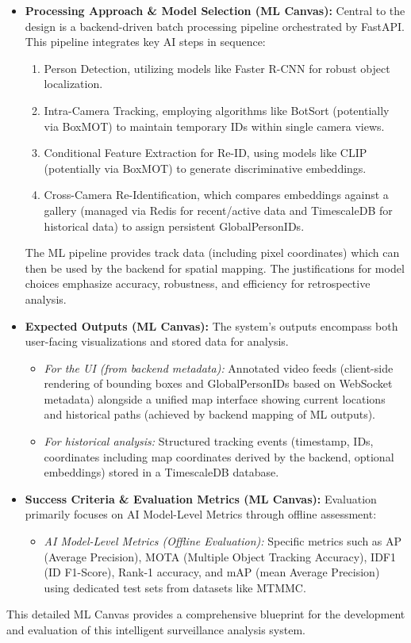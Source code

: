 \begin{itemize}
    \item \textbf{Processing Approach \& Model Selection (ML Canvas):}
        Central to the design is a backend-driven batch processing pipeline orchestrated by FastAPI. This pipeline integrates key AI steps in sequence:
        \begin{enumerate}[label=(\Alph*)]
            \item Person Detection, utilizing models like Faster R-CNN for robust object localization.
            \item Intra-Camera Tracking, employing algorithms like BotSort (potentially via BoxMOT) to maintain temporary IDs within single camera views.
            \item Conditional Feature Extraction for Re-ID, using models like CLIP (potentially via BoxMOT) to generate discriminative embeddings.
            \item Cross-Camera Re-Identification, which compares embeddings against a gallery (managed via Redis for recent/active data and TimescaleDB for historical data) to assign persistent GlobalPersonIDs.
        \end{enumerate}
        The ML pipeline provides track data (including pixel coordinates) which can then be used by the backend for spatial mapping. The justifications for model choices emphasize accuracy, robustness, and efficiency for retrospective analysis.

    \item \textbf{Expected Outputs (ML Canvas):}
        The system's outputs encompass both user-facing visualizations and stored data for analysis.
        \begin{itemize}
            \item \textit{For the UI (from backend metadata):} Annotated video feeds (client-side rendering of bounding boxes and GlobalPersonIDs based on WebSocket metadata) alongside a unified map interface showing current locations and historical paths (achieved by backend mapping of ML outputs).
            \item \textit{For historical analysis:} Structured tracking events (timestamp, IDs, coordinates including map coordinates derived by the backend, optional embeddings) stored in a TimescaleDB database.
        \end{itemize}

    \item \textbf{Success Criteria \& Evaluation Metrics (ML Canvas):}
        Evaluation primarily focuses on AI Model-Level Metrics through offline assessment:
        \begin{itemize}
            \item \textit{AI Model-Level Metrics (Offline Evaluation):} Specific metrics such as AP (Average Precision), MOTA (Multiple Object Tracking Accuracy), IDF1 (ID F1-Score), Rank-1 accuracy, and mAP (mean Average Precision) using dedicated test sets from datasets like MTMMC.
        \end{itemize}
\end{itemize}
This detailed ML Canvas provides a comprehensive blueprint for the development and evaluation of this intelligent surveillance analysis system.

